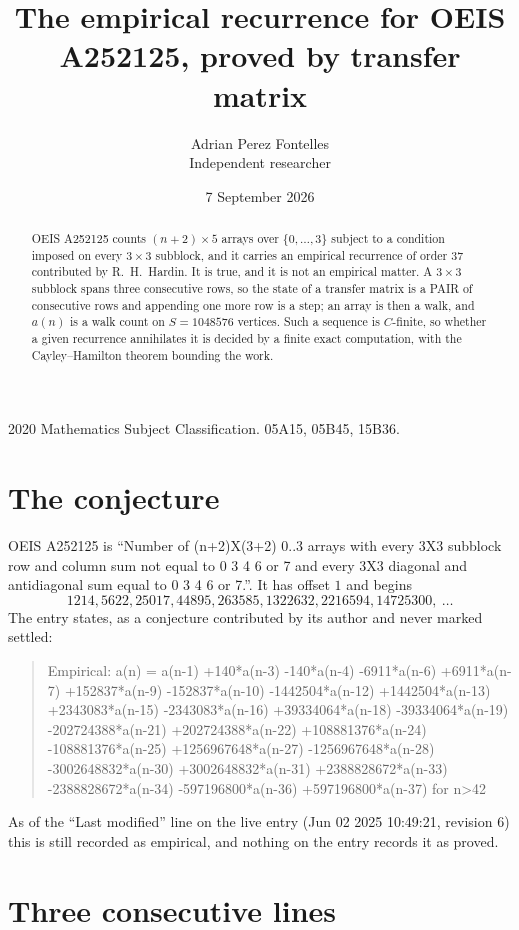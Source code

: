 \documentclass[11pt,a4paper]{article}
\title{The empirical recurrence for OEIS A252125, proved by transfer matrix}
\author{Adrian Perez Fontelles\\ \small Independent researcher}
\date{7 September 2026}
\theoremstyle{plain}
\theoremstyle{definition}
\begin{document}
\maketitle

\begin{abstract}
OEIS A252125 counts $(n+2)\times5$ arrays over $\{0,\dots,3\}$ subject to a condition imposed on
every $3\times3$ subblock, and it carries an empirical recurrence of order $37$
contributed by R.~H.~Hardin. It is true, and it is not an empirical matter. A $3\times3$
subblock spans three consecutive rows, so the state of a transfer matrix is a PAIR of
consecutive rows and appending one more row is a step; an array is then a walk, and
$a(n)$ is a walk count on $S=1048576$ vertices. Such a sequence is $C$-finite, so whether a given
recurrence annihilates it is decided by a finite exact computation, with the Cayley--Hamilton
theorem bounding the work.
\end{abstract}

\noindent\small 2020 Mathematics Subject Classification. 05A15, 05B45, 15B36.\normalsize

\section{The conjecture}

OEIS A252125 is ``Number of (n+2)X(3+2) 0..3 arrays with every 3X3 subblock row and column sum not equal to 0 3 4 6 or 7 and every 3X3 diagonal and antidiagonal sum equal to 0 3 4 6 or 7.''. It has offset $1$ and begins
\[
1214, 5622, 25017, 44895, 263585, 1322632, 2216594, 14725300,\ \dots
\]
The entry states, as a conjecture contributed by its author and never marked settled:
\begin{quote}
Empirical: a(n) = a(n-1) +140*a(n-3) -140*a(n-4) -6911*a(n-6) +6911*a(n-7) +152837*a(n-9) -152837*a(n-10) -1442504*a(n-12) +1442504*a(n-13) +2343083*a(n-15) -2343083*a(n-16) +39334064*a(n-18) -39334064*a(n-19) -202724388*a(n-21) +202724388*a(n-22) +108881376*a(n-24) -108881376*a(n-25) +1256967648*a(n-27) -1256967648*a(n-28) -3002648832*a(n-30) +3002648832*a(n-31) +2388828672*a(n-33) -2388828672*a(n-34) -597196800*a(n-36) +597196800*a(n-37) for n>42
\end{quote}
As of the ``Last modified'' line on the live entry (Jun 02 2025 10:49:21, revision 6) this is still
recorded as empirical, and nothing on the entry records it as proved.

\section{Three consecutive lines}
\end{document}
